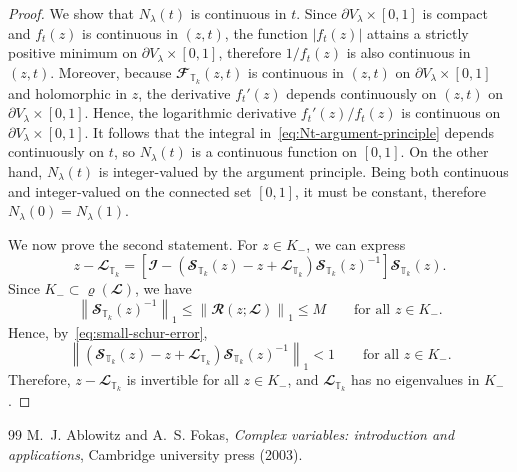 \documentclass[10pt,a4paper]{amsart}
\newcommand{\LI}{{\mathbb T}}
\begin{document}
\begin{proof}
    We show that \(N_\lambda(t)\) is continuous in \(t\). Since \(\partial V_\lambda \times [0,1]\) is compact and \(f_t(z)\) is continuous in $(z,t)$, the function \(|f_t(z)|\) attains a strictly positive minimum on \(\partial V_\lambda \times [0,1]\), therefore $1 / f_t(z)$ is also continuous in $(z, t)$. Moreover, because \(\mathbfcal F_{\LI_k}(z,t)\) is continuous in \((z,t)\) on \(\partial V_\lambda \times [0,1]\) and holomorphic in \(z\), the derivative \(f_t'(z)\) depends continuously on \((z,t)\) on \(\partial V_\lambda \times [0,1]\). Hence, the logarithmic derivative ${f_t'(z)}/{f_t(z)}$ is continuous on \(\partial V_\lambda \times [0,1]\). It follows that the integral in~\eqref{eq:Nt-argument-principle} depends continuously on \(t\), so \(N_\lambda(t)\) is a continuous function on \([0,1]\). On the other hand, \(N_\lambda(t)\) is integer-valued by the argument principle. Being both continuous and integer-valued on the connected set \([0,1]\), it must be constant, therefore $N_\lambda(0) = N_\lambda(1)$.

    We now prove the second statement. For \(z \in K_-\), we can express
    \begin{equation}
        z-\mathbfcal L_{\LI_k}
        =
        \left[
            \mathbfcal I
            -
            \left(
                \mathbfcal S_{\LI_k}(z)-z+\mathbfcal L_{\LI_k}
            \right)
            \mathbfcal S_{\LI_k}(z)^{-1}
        \right]
    \mathbfcal S_{\LI_k}(z).
    \end{equation}
    Since \(K_- \subset \varrho(\mathbfcal L)\), we have
    \begin{equation}
        \left \|
        \mathbfcal S_{\LI_k}(z)^{-1}
        \right \|_1
        \leqslant
        \left \|
        \mathbfcal R(z;\mathbfcal L)
        \right \|_1
        \leqslant
        M
        \qquad
        \text{for all } z \in K_-.
    \end{equation}
    Hence, by~\eqref{eq:small-schur-error},
    \begin{equation}
        \left \|
        \left(
            \mathbfcal S_{\LI_k}(z)-z+\mathbfcal L_{\LI_k}
        \right)
        \mathbfcal S_{\LI_k}(z)^{-1}
        \right \|_1
        < 1
        \qquad
        \text{for all } z \in K_-.
    \end{equation}
    Therefore, \(z-\mathbfcal L_{\LI_k}\) is invertible for all \(z \in K_-\), and \(\mathbfcal L_{\LI_k}\) has no eigenvalues in \(K_-\).
\end{proof}

\begin{thebibliography}{99}
 M.~J. Ablowitz and A.~S. Fokas, \newblock \emph{Complex variables: introduction and applications}, \newblock Cambridge university press (2003).
\end{thebibliography}
\end{document}
